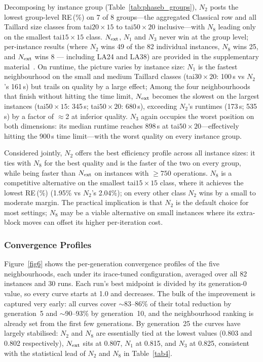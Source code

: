 \documentclass[preprint,12pt]{elsarticle}
\begin{document}
Decomposing by instance group (Table~\ref{tab:phaseb_groups}), $N_2$ posts the lowest group-level RE\,(\%) on 7 of 8 groups---the aggregated Classical row and all Taillard size classes from tai$20{\times}15$ to tai$50{\times}20$ inclusive---with $N_8$ leading only on the smallest tai$15{\times}15$ class. $N_{\rm ext}$, $N_1$ and $N_3$ never win at the group level; per-instance results (where $N_2$ wins 49 of the 82 individual instances, $N_8$ wins 25, and $N_{\rm ext}$ wins 8 --- including LA24 and LA38) are provided in the supplementary material~\cite{DiazSupp2026}. On runtime, the picture varies by instance size: $N_1$ is the fastest neighbourhood on the small and medium Taillard classes (tai$30{\times}20$: 100\,s vs $N_2$'s 161\,s) but trails on quality by a large effect; Among the four neighbourhoods that finish without hitting the time limit, $N_{\rm ext}$ becomes the slowest on the largest instances (tai$50{\times}15$: 345\,s; tai$50{\times}20$: 680\,s), exceeding $N_2$'s runtimes (173\,s; 535\,s) by a factor of $\approx$2 at inferior quality. $N_3$ again occupies the worst position on both dimensions: its median runtime reaches 898\,s at tai$50{\times}20$---effectively hitting the 900\,s time limit---with the worst quality on every instance group.

Considered jointly, $N_2$ offers the best efficiency profile across all instance sizes: it ties with $N_8$ for the best quality and is the faster of the two on every group, while being faster than $N_{\rm ext}$ on instances with $\geq 750$ operations. $N_8$ is a competitive alternative on the smallest tai$15{\times}15$ class, where it achieves the lowest RE\,(\%) (1.95\% vs $N_2$'s 2.04\%); on every other class $N_2$ wins by a small to moderate margin. The practical implication is that $N_2$ is the default choice for most settings; $N_8$ may be a viable alternative on small instances where its extra-block moves can offset its higher per-iteration cost.

\subsubsection{Convergence Profiles}
\label{sec:convergence}

Figure~\ref{fig6} shows the per-generation convergence profiles of the five neighbourhoods, each under its irace-tuned configuration, averaged over all 82 instances and 30 runs. Each run's best midpoint is divided by its generation-0 value, so every curve starts at 1.0 and decreases. The bulk of the improvement is captured very early: all curves cover $\sim$83--86\% of their total reduction by generation~5 and $\sim$90--93\% by generation~10, and the neighbourhood ranking is already set from the first few generations. By generation~25 the curves have largely stabilised: $N_2$ and $N_8$ are essentially tied at the lowest values (0.803 and 0.802 respectively), $N_{\rm ext}$ sits at 0.807, $N_1$ at 0.815, and $N_3$ at 0.825, consistent with the statistical lead of $N_2$ and $N_8$ in Table~\ref{tab4}.
\end{document}
